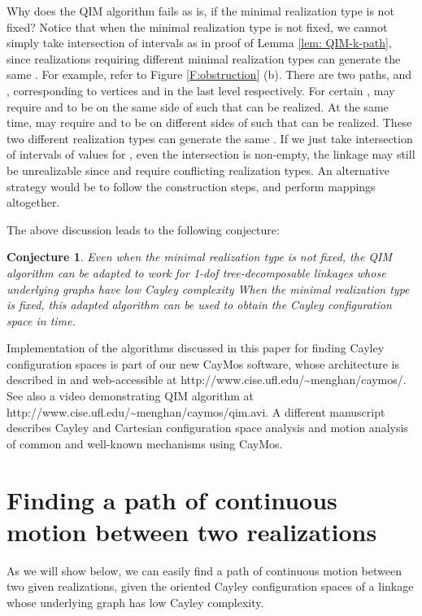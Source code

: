 \documentclass[secthm,amsthm,english]{article}
\newtheorem{conjecture}{Conjecture}
\theoremstyle{definition}
\theoremstyle{remark}
\begin{document}
Why does the QIM algorithm fails as is,  
if the minimal realization type is not fixed? 
Notice that when the minimal realization type is not fixed, 
we cannot simply take intersection of intervals as in proof of Lemma \ref{lem: QIM-k-path}, since realizations requiring different minimal realization types can generate the same  . For example, refer to Figure \ref{F:obstruction} (b). 
There are two paths,  and , 
corresponding to vertices  and  in the last level respectively. 
For certain , 
 may require  and  to be on the same side of  such that  can be realized. 
At the same time, 
 may require  and  to be on different sides of  such that  can be realized.
These two different realization types can generate the same . If we just take intersection of intervals of values for , even the intersection is non-empty, the linkage may still be unrealizable since  and  require conflicting realization types. 
An alternative strategy would be to follow the construction steps, 
and perform  mappings altogether. 

The above discussion leads to the following conjecture: 

\begin{conjecture}
Even when the minimal realization type is not fixed, 
the QIM algorithm can be adapted to work for 1-dof tree-decomposable linkages whose underlying graphs have low Cayley complexity 
When the minimal realization type is fixed, 
this adapted algorithm can be used to obtain the Cayley configuration space in  time. 
\end{conjecture}

\medskip
\noindent 
Implementation of the algorithms discussed in this paper 
for finding Cayley configuration spaces is part of our new CayMos software,
whose architecture is described in \cite{bib:caymos} and 
web-accessible at http://www.cise.ufl.edu/\~{}menghan/caymos/. 
See also a video demonstrating QIM algorithm 
at http://www.cise.ufl.edu/\~{}menghan/caymos/qim.avi.
A different manuscript \cite{bib:beest} describes Cayley and Cartesian configuration space analysis and motion analysis 
of common and well-known mechanisms using CayMos.



\section{Finding a path of continuous motion between two realizations}
\label{sec:cont-path}

As we will show below, 
we can easily find a path of continuous motion between two given realizations, 
given the oriented Cayley configuration spaces of a linkage 
whose underlying graph has low Cayley complexity. 
\end{document}
